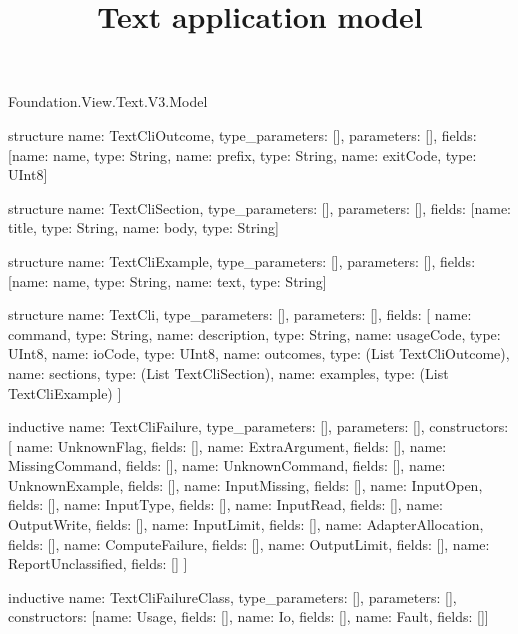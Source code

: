 \begin{lexlean}{Foundation.View.Text.V3.Model}
\title{Text application model}
\begin{semanticmodule}
structure{
  name: TextCliOutcome,
  type_parameters: [],
  parameters: [],
  fields: [{name: name, type: String}, {name: prefix, type: String}, {name: exitCode, type: UInt8}]
}

structure{
  name: TextCliSection,
  type_parameters: [],
  parameters: [],
  fields: [{name: title, type: String}, {name: body, type: String}]
}

structure{
  name: TextCliExample,
  type_parameters: [],
  parameters: [],
  fields: [{name: name, type: String}, {name: text, type: String}]
}

structure{
  name: TextCli,
  type_parameters: [],
  parameters: [],
  fields: [
    {name: command, type: String},
    {name: description, type: String},
    {name: usageCode, type: UInt8},
    {name: ioCode, type: UInt8},
    {name: outcomes, type: (List TextCliOutcome)},
    {name: sections, type: (List TextCliSection)},
    {name: examples, type: (List TextCliExample)}
  ]
}

inductive{
  name: TextCliFailure,
  type_parameters: [],
  parameters: [],
  constructors: [
    {name: UnknownFlag, fields: []},
    {name: ExtraArgument, fields: []},
    {name: MissingCommand, fields: []},
    {name: UnknownCommand, fields: []},
    {name: UnknownExample, fields: []},
    {name: InputMissing, fields: []},
    {name: InputOpen, fields: []},
    {name: InputType, fields: []},
    {name: InputRead, fields: []},
    {name: OutputWrite, fields: []},
    {name: InputLimit, fields: []},
    {name: AdapterAllocation, fields: []},
    {name: ComputeFailure, fields: []},
    {name: OutputLimit, fields: []},
    {name: ReportUnclassified, fields: []}
  ]
}

inductive{
  name: TextCliFailureClass,
  type_parameters: [],
  parameters: [],
  constructors: [{name: Usage, fields: []}, {name: Io, fields: []}, {name: Fault, fields: []}]
}


\end{semanticmodule}
\end{lexlean}

